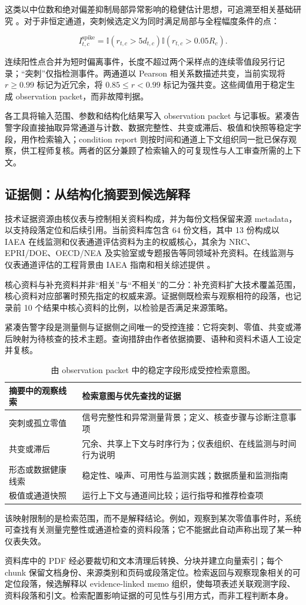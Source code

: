 这类以中位数和绝对偏差抑制局部异常影响的稳健估计思想，可追溯至相关基础研究 \citep{hampel1974influence,rousseeuw1993alternatives}。对于非恒定通道，突刺候选定义为同时满足局部与全程幅度条件的点：

\[
I^{\mathrm{spike}}_{t,c}=
\mathbb{I}\!\left(r_{t,c}>5d_{t,c}\right)
\mathbb{I}\!\left(r_{t,c}>0.05R_c\right).
\]

连续阳性点合并为短时偏离事件，长度不超过两个采样点的连续零值段另行记录；“突刺”仅指检测事件。两通道以 Pearson 相关系数描述共变，当前实现将 $r\geq0.99$ 标记为近冗余，将 $0.85\leq r<0.99$ 标记为强共变。这些阈值用于稳定生成 observation packet，而非故障判据。

各工具将输入范围、参数和结构化结果写入 observation packet 与记事板。紧凑告警字段直接抽取异常通道与计数、数据完整性、共变或滞后、极值和快照等稳定字段，用作检索输入；condition report 则按时间和通道上下文组织同一批已保存观察，供工程师复核。两者的区分兼顾了检索输入的可复现性与人工审查所需的上下文。

\subsection{证据侧：从结构化摘要到候选解释}

技术证据资源由核仪表与控制相关资料构成，并为每份文档保留来源 metadata，以支持段落定位和后续引用。当前资料库包含 64 份文档，其中 13 份构成以 IAEA 在线监测和仪表通道评估资料为主的权威核心，其余为 NRC、EPRI/DOE、OECD/NEA 及实验室或专题报告等同领域补充资料。在线监测与仪表通道评估的工程背景由 IAEA 指南和相关综述提供 \citep{iaea2008olm1,iaea2008olm2,hashemian2011online}。

核心资料与补充资料并非“相关”与“不相关”的二分：补充资料扩大技术覆盖范围，核心资料对应部署时预先指定的权威来源。证据侧既检索与观察相符的段落，也记录前 10 个结果中核心资料的比例，以检验是否满足来源策略。

紧凑告警字段是测量侧与证据侧之间唯一的受控连接：它将突刺、零值、共变或滞后映射为待核查的技术主题。查询措辞由作者依据摘要、语种和资料术语人工设定并复核。

\begin{table}[H]
\centering
\footnotesize
\setlength{\tabcolsep}{2pt}
\begin{tabular}{p{} p{}}
\toprule
摘要中的观察线索 & 检索意图与优先查找的证据 \\
\midrule
突刺或孤立零值 & 信号完整性和异常测量背景；定义、核查步骤与诊断注意事项 \\
共变或滞后 & 冗余、共享上下文与时序行为；仪表组织、在线监测与时间行为说明 \\
形态或数据健康线索 & 稳定性、噪声、可用性与监测实践；数据质量和监测指南 \\
极值或通道快照 & 运行上下文与通道间比较；运行指导和推荐检查项 \\
\bottomrule
\end{tabular}
\caption{由 observation packet 中的稳定字段形成受控检索意图。}
\label{tab:retrieval-intent}
\end{table}


该映射限制的是检索范围，而不是解释结论。例如，观察到某次零值事件时，系统可查找有关测量完整性或通道检查的资料段落；它不能据此自动声称出现了某一种仪表失效。

资料库中的 PDF 经必要裁切和文本清理后转换、分块并建立向量索引；每个 chunk 保留文档身份、来源类别和页码或段落定位。检索返回与观察现象相关的可定位段落，候选解释以 evidence-linked memo 组织，使每项表述关联观测字段、资料段落和引文。检索配置影响证据的可见性与引用方式，而非工程判断本身。

